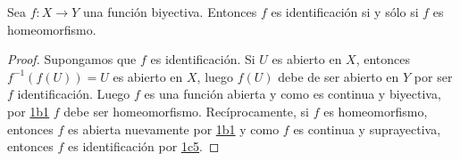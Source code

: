 

\begin{proposition}
Sea $f : X \longrightarrow Y$ una función biyectiva. Entonces $f$ es identificación si y sólo si $f$ es homeomorfismo.
\end{proposition}

\begin{proof}
Supongamos que $f$ es identificación. Si $U$ es abierto en $X$, entonces $f^{-1}(f(U)) = U$ es abierto en $X$, luego $f(U)$ debe de ser abierto en $Y$ por ser $f$ identificación. Luego $f$ es una función abierta y como es continua y biyectiva, por \hyperref[card:1b1]{\textsf{1b1}} $f$ debe ser homeomorfismo. Recíprocamente, si $f$ es homeomorfismo, entonces $f$ es abierta nuevamente por \hyperref[card:1b1]{\textsf{1b1}} y como $f$ es continua y suprayectiva, entonces $f$ es identificación por \hyperref[card:1c5]{\textsf{1c5}}.
\end{proof}
